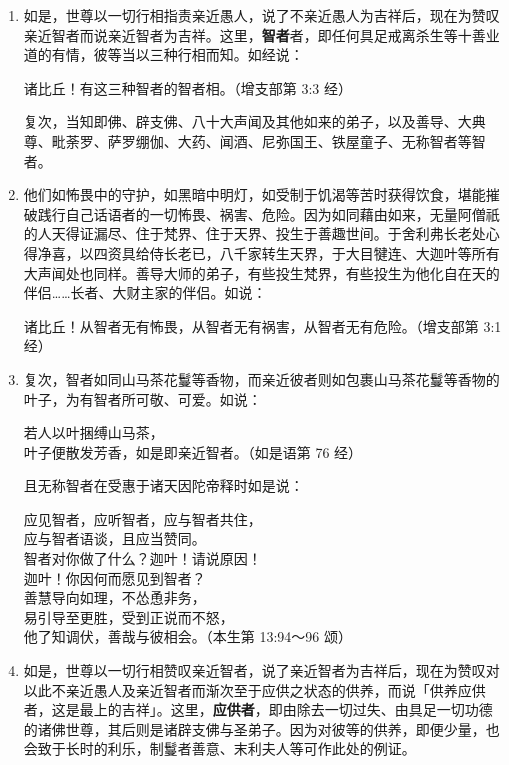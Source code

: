 \begin{enumerate}
\item 如是，世尊以一切行相指责亲近愚人，说了不亲近愚人为吉祥后，现在为赞叹亲近智者而说亲近智者为吉祥。这里，\textbf{智者}者，即任何具足戒离杀生等十善业道的有情，彼等当以三种行相而知。如经说：\begin{quoting}诸比丘！有这三种智者的智者相。（增支部第 3:3 经）\end{quoting}复次，当知即佛、辟支佛、八十大声闻及其他如来的弟子，以及善导、大典尊、毗荼罗、萨罗绷伽、大药、闻酒、尼弥国王、铁屋童子、无称智者等智者。
\item 他们如怖畏中的守护，如黑暗中明灯，如受制于饥渴等苦时获得饮食，堪能摧破践行自己话语者的一切怖畏、祸害、危险。因为如同藉由如来，无量阿僧祇的人天得证漏尽、住于梵界、住于天界、投生于善趣世间。于舍利弗长老处心得净喜，以四资具给侍长老已，八千家转生天界，于大目犍连、大迦叶等所有大声闻处也同样。善导大师的弟子，有些投生梵界，有些投生为他化自在天的伴侣……长者、大财主家的伴侣。如说：\begin{quoting}诸比丘！从智者无有怖畏，从智者无有祸害，从智者无有危险。（增支部第 3:1 经）\end{quoting}
\item 复次，智者如同山马茶花鬘等香物，而亲近彼者则如包裹山马茶花鬘等香物的叶子，为有智者所可敬、可爱。如说：\begin{quoting}若人以叶捆缚山马茶，\\叶子便散发芳香，如是即亲近智者。（如是语第 76 经）\end{quoting}且无称智者在受惠于诸天因陀帝释时如是说：\begin{quoting}应见智者，应听智者，应与智者共住，\\应与智者语谈，且应当赞同。\\智者对你做了什么？迦叶！请说原因！\\迦叶！你因何而愿见到智者？\\善慧导向如理，不怂恿非务，\\易引导至更胜，受到正说而不怒，\\他了知调伏，善哉与彼相会。（本生第 13:94～96 颂）\end{quoting}
\item 如是，世尊以一切行相赞叹亲近智者，说了亲近智者为吉祥后，现在为赞叹对以此不亲近愚人及亲近智者而渐次至于应供之状态的供养，而说「供养应供者，这是最上的吉祥」。这里，\textbf{应供者}，即由除去一切过失、由具足一切功德的诸佛世尊，其后则是诸辟支佛与圣弟子。因为对彼等的供养，即便少量，也会致于长时的利乐，制鬘者善意、末利夫人等可作此处的例证。

\end{enumerate}
